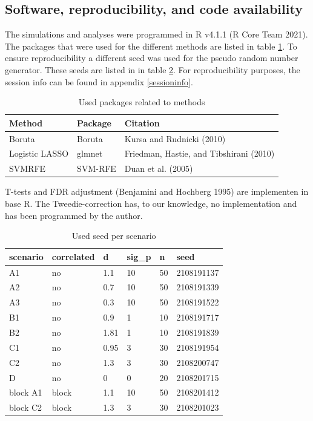 \documentclass[
]{article}
\begin{document}
\hypertarget{software-reproducibility-and-code-availability}{%
\subsection{Software, reproducibility, and code availability}\label{software-reproducibility-and-code-availability}}

The simulations and analyses were programmed in R v4.1.1 (R Core Team 2021). The packages that were used for the different methods are listed in table \ref{tab:packages}. To ensure reproducibility a different seed was used for the pseudo random number generator. These seeds are listed in in table \ref{tab:seeds}. For reproducibility purposes, the session info can be found in appendix \ref{sessioninfo}.

\begin{table}

\caption{\label{tab:packages}Used packages related to methods}
\centering
\begin{tabular}[t]{lll}
\toprule
Method & Package & Citation\\
\midrule
Boruta & Boruta & Kursa and Rudnicki (2010)\\
Logistic LASSO & glmnet & Friedman, Hastie, and Tibshirani (2010)\\
SVMRFE & SVM-RFE & Duan et al. (2005)\\
\bottomrule
\end{tabular}
\end{table}

T-tests and FDR adjustment (Benjamini and Hochberg 1995) are implementen in base R. The Tweedie-correction has, to our knowledge, no implementation and has been programmed by the author.

\begin{table}

\caption{\label{tab:seeds}Used seed per scenario}
\centering
\begin{tabular}[t]{llllll}
\toprule
scenario & correlated & d & sig\_p & n & seed\\
\midrule
A1 & no & 1.1 & 10 & 50 & 2108191137\\
A2 & no & 0.7 & 10 & 50 & 2108191339\\
A3 & no & 0.3 & 10 & 50 & 2108191522\\
B1 & no & 0.9 & 1 & 10 & 2108191717\\
B2 & no & 1.81 & 1 & 10 & 2108191839\\
\addlinespace
C1 & no & 0.95 & 3 & 30 & 2108191954\\
C2 & no & 1.3 & 3 & 30 & 2108200747\\
D & no & 0 & 0 & 20 & 2108201715\\
block A1 & block & 1.1 & 10 & 50 & 2108201412\\
block C2 & block & 1.3 & 3 & 30 & 2108201023\\
\bottomrule
\end{tabular}
\end{table}
\end{document}
